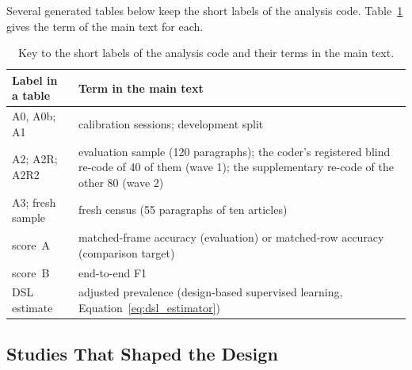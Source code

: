 \noindent Several generated tables below keep the short labels of the analysis code. Table~\ref{tab:label_key} gives the term of the main text for each.

\begin{table}[htbp]\centering\footnotesize
\caption[Key to the labels of the analysis code]{Key to the short labels of the analysis code and their terms in the main text.}\label{tab:label_key}
\begin{tabular}{@{}>{\raggedright\arraybackslash}p{36mm}>{\raggedright\arraybackslash}p{112mm}@{}}
\toprule
\textbf{Label in a table} & \textbf{Term in the main text} \\
\midrule
A0, A0b; A1 & calibration sessions; development split \\
A2; A2R; A2R2 & evaluation sample (120 paragraphs); the coder's registered blind re-code of 40 of them (wave 1); the supplementary re-code of the other 80 (wave 2) \\
A3; fresh sample & fresh census (55 paragraphs of ten articles) \\
score~A & matched-frame accuracy (evaluation) or matched-row accuracy (comparison target) \\
score~B & end-to-end F1 \\
DSL estimate & adjusted prevalence (design-based supervised learning, Equation~\eqref{eq:dsl_estimator}) \\
\bottomrule
\end{tabular}
\end{table}

\subsection{Studies That Shaped the Design}\label{app:literature}

